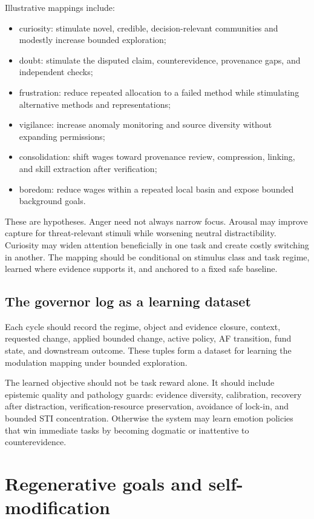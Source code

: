 \documentclass[11pt]{article}
\begin{document}
Illustrative mappings include:
\begin{itemize}
  \item curiosity: stimulate novel, credible, decision-relevant communities
  and modestly increase bounded exploration;
  \item doubt: stimulate the disputed claim, counterevidence, provenance gaps,
  and independent checks;
  \item frustration: reduce repeated allocation to a failed method while
  stimulating alternative methods and representations;
  \item vigilance: increase anomaly monitoring and source diversity without
  expanding permissions;
  \item consolidation: shift wages toward provenance review, compression,
  linking, and skill extraction after verification;
  \item boredom: reduce wages within a repeated local basin and expose bounded
  background goals.
\end{itemize}

These are hypotheses.  Anger need not always narrow focus.  Arousal may improve
capture for threat-relevant stimuli while worsening neutral distractibility.
Curiosity may widen attention beneficially in one task and create costly
switching in another.  The mapping should be conditional on stimulus class and
task regime, learned where evidence supports it, and anchored to a fixed safe
baseline.

\subsection{The governor log as a learning dataset}

Each cycle should record the regime, object and evidence closure, context,
requested change, applied bounded change, active policy, AF transition, fund
state, and downstream outcome.  These tuples form a dataset for learning the
modulation mapping under bounded exploration.

The learned objective should not be task reward alone.  It should include
epistemic quality and pathology guards: evidence diversity, calibration,
recovery after distraction, verification-resource preservation, avoidance of
lock-in, and bounded STI concentration.  Otherwise the system may learn
emotion policies that win immediate tasks by becoming dogmatic or inattentive
to counterevidence.

\section{Regenerative goals and self-modification}
\end{document}
